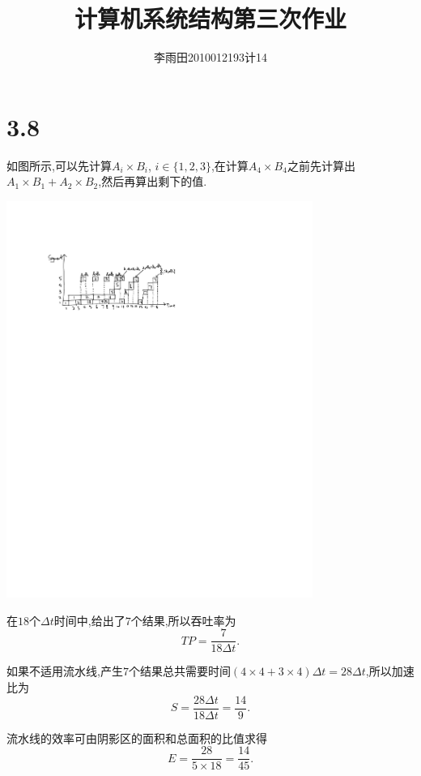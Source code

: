 \documentclass[adobefonts, nocap]{ctexart}
\begin{document}
  \title{计算机系统结构第三次作业}
  \author{李雨田\hspace{1em}2010012193\hspace{1em}计14}
  \maketitle
  \section*{3.8}
    如图所示,可以先计算$A_{i}\times B_{i}$, $i\in \{1,2,3\}$,在计算$A_{4}\times B_{4}$之前先计算出$A_{1}\times B_{1}+A_{2}\times B_{2}$,然后再算出剩下的值.

    \begin{center}
      \centering
      \includegraphics[width=10cm]{1-crop.pdf}
    \end{center}
    
    在$18$个$\Delta t$时间中,给出了$7$个结果,所以吞吐率为
    \[
      TP=\frac{7}{18\Delta t}.
    \]

    如果不适用流水线,产生$7$个结果总共需要时间$(4\times 4+3\times 4)\Delta t=28\Delta t$,所以加速比为
    \[
      S=\frac{28\Delta t}{18\Delta t}=\frac{14}{9}.
    \]

    流水线的效率可由阴影区的面积和总面积的比值求得
    \[
      E=\frac{28}{5\times 18}=\frac{14}{45}.
    \]
\end{document}
